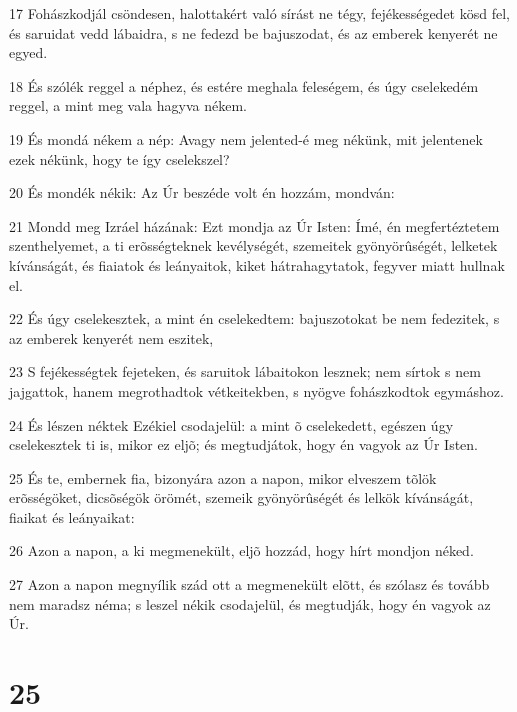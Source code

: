 \par 17 Fohászkodjál csöndesen, halottakért való sírást ne tégy, fejékességedet kösd fel, és saruidat vedd lábaidra, s ne fedezd be bajuszodat, és az emberek kenyerét ne egyed.
\par 18 És szólék reggel a néphez, és estére meghala feleségem, és úgy cselekedém reggel, a mint meg vala hagyva nékem.
\par 19 És mondá nékem a nép: Avagy nem jelented-é meg nékünk, mit jelentenek ezek nékünk, hogy te így cselekszel?
\par 20 És mondék nékik: Az Úr beszéde volt én hozzám, mondván:
\par 21 Mondd meg Izráel házának: Ezt mondja az Úr Isten: Ímé, én megfertéztetem szenthelyemet, a ti erõsségteknek kevélységét, szemeitek gyönyörûségét, lelketek kívánságát, és fiaiatok és leányaitok, kiket hátrahagytatok, fegyver miatt hullnak el.
\par 22 És úgy cselekesztek, a mint én cselekedtem: bajuszotokat be nem fedezitek, s az emberek kenyerét nem eszitek,
\par 23 S fejékességtek fejeteken, és saruitok lábaitokon lesznek; nem sírtok s nem jajgattok, hanem megrothadtok vétkeitekben, s nyögve fohászkodtok egymáshoz.
\par 24 És lészen néktek Ezékiel csodajelül: a mint õ cselekedett, egészen úgy cselekesztek ti is, mikor ez eljõ; és megtudjátok, hogy én vagyok az Úr Isten.
\par 25 És te, embernek fia, bizonyára azon a napon, mikor elveszem tõlök erõsségöket, dicsõségök örömét, szemeik gyönyörûségét és lelkök kívánságát, fiaikat és leányaikat:
\par 26 Azon a napon, a ki megmenekült, eljõ hozzád, hogy hírt mondjon néked.
\par 27 Azon a napon megnyílik szád ott a megmenekült elõtt, és szólasz és tovább nem maradsz néma; s leszel nékik csodajelül, és megtudják, hogy én vagyok az Úr.

\chapter{25}

